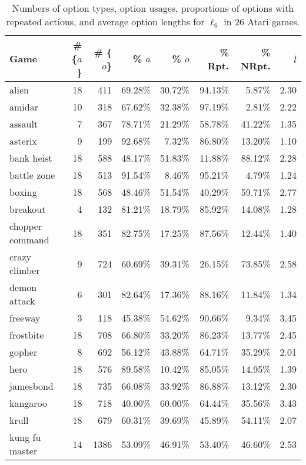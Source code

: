 \begin{table}[h!]
\caption{Numbers of option types, option usages, proportions of options with repeated actions, and average option lengths for $\ell_6$ in 26 Atari games.}
\centering
\small
\begin{tabular}{l|rrrrrrr}
    \toprule
    Game & \# \{$a$\} & \# \{$o$\} & \% $a$ & \% $o$ & \% Rpt. & \% NRpt. & $\bar{l}$ \\
    \midrule
    alien & 18 & 411 & 69.28\% & 30.72\% & 94.13\% & 5.87\% & 2.30 \\
    amidar & 10 & 318 & 67.62\% & 32.38\% & 97.19\% & 2.81\% & 2.22 \\
    assault & 7 & 367 & 78.71\% & 21.29\% & 58.78\% & 41.22\% & 1.35 \\
    asterix & 9 & 199 & 92.68\% & 7.32\% & 86.80\% & 13.20\% & 1.10 \\
    bank heist & 18 & 588 & 48.17\% & 51.83\% & 11.88\% & 88.12\% & 2.28 \\
    battle zone & 18 & 513 & 91.54\% & 8.46\% & 95.21\% & 4.79\% & 1.24 \\
    boxing & 18 & 568 & 48.46\% & 51.54\% & 40.29\% & 59.71\% & 2.77 \\
    breakout & 4 & 132 & 81.21\% & 18.79\% & 85.92\% & 14.08\% & 1.28 \\
    chopper command & 18 & 351 & 82.75\% & 17.25\% & 87.56\% & 12.44\% & 1.40 \\
    crazy climber & 9 & 724 & 60.69\% & 39.31\% & 26.15\% & 73.85\% & 2.58 \\
    demon attack & 6 & 301 & 82.64\% & 17.36\% & 88.16\% & 11.84\% & 1.34 \\
    freeway & 3 & 118 & 45.38\% & 54.62\% & 90.66\% & 9.34\% & 3.45 \\
    frostbite & 18 & 708 & 66.80\% & 33.20\% & 86.23\% & 13.77\% & 2.45 \\
    gopher & 8 & 692 & 56.12\% & 43.88\% & 64.71\% & 35.29\% & 2.01 \\
    hero & 18 & 576 & 89.58\% & 10.42\% & 85.05\% & 14.95\% & 1.39 \\
    jamesbond & 18 & 735 & 66.08\% & 33.92\% & 86.88\% & 13.12\% & 2.30 \\
    kangaroo & 18 & 718 & 40.00\% & 60.00\% & 64.44\% & 35.56\% & 3.43 \\
    krull & 18 & 679 & 60.31\% & 39.69\% & 45.89\% & 54.11\% & 2.07 \\
    kung fu master & 14 & 1386 & 53.09\% & 46.91\% & 53.40\% & 46.60\% & 2.53 \\

\end{tabular}
\end{table}
